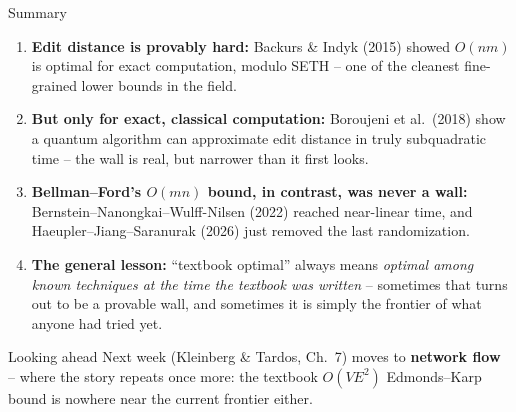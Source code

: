 \documentclass[11pt,aspectratio=169]{beamer}
\begin{document}
\begin{frame}{Summary}
  \small
  \begin{enumerate}
    \item \textbf{Edit distance is provably hard:} Backurs \& Indyk (2015) showed
    $O(nm)$ is optimal for exact computation, modulo SETH -- one of the cleanest
    fine-grained lower bounds in the field.
    \item \textbf{But only for exact, classical computation:} Boroujeni et al.\ (2018)
    show a quantum algorithm can approximate edit distance in truly subquadratic time --
    the wall is real, but narrower than it first looks.
    \item \textbf{Bellman--Ford's $O(mn)$ bound, in contrast, was never a wall:}
    Bernstein--Nanongkai--Wulff-Nilsen (2022) reached near-linear time, and
    Haeupler--Jiang--Saranurak (2026) just removed the last randomization.
    \item \textbf{The general lesson:} ``textbook optimal'' always means
    \emph{optimal among known techniques at the time the textbook was written} --
    sometimes that turns out to be a provable wall, and sometimes it is simply the
    frontier of what anyone had tried yet.
  \end{enumerate}
  \begin{alertblock}{Looking ahead}
    Next week (Kleinberg \& Tardos, Ch.\ 7) moves to \textbf{network flow} -- where the
    story repeats once more: the textbook $O(VE^2)$ Edmonds--Karp bound is nowhere near
    the current frontier either.
  \end{alertblock}
\end{frame}
\end{document}
